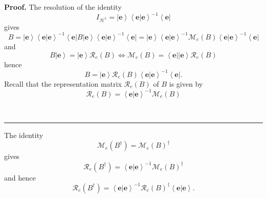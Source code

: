 \documentclass[aps,preprint]{revtex4}%
\newenvironment{proof}[1][Proof]{\noindent\textbf{#1.} }{\ \rule{0.5em}{0.5em}}
\begin{document}
\begin{proof}
The resolution of the identity%
\begin{equation}
I_{\mathcal{H}^{1}}=\left\vert \mathbf{e}\right\rangle \left\langle \left.
\mathbf{e}\right\vert \mathbf{e}\right\rangle ^{-1}\left\langle \mathbf{e}%
\right\vert
\end{equation}
gives
\begin{equation}
B=\left\vert \mathbf{e}\right\rangle \left\langle \left.  \mathbf{e}%
\right\vert \mathbf{e}\right\rangle ^{-1}\left\langle \mathbf{e}\right\vert
B\left\vert \mathbf{e}\right\rangle \left\langle \left.  \mathbf{e}\right\vert
\mathbf{e}\right\rangle ^{-1}\left\langle \mathbf{e}\right\vert =\left\vert
\mathbf{e}\right\rangle \left\langle \left.  \mathbf{e}\right\vert
\mathbf{e}\right\rangle ^{-1}\mathcal{M}_{e}\left(  B\right)  \left\langle
\left.  \mathbf{e}\right\vert \mathbf{e}\right\rangle ^{-1}\left\langle
\mathbf{e}\right\vert
\end{equation}
and
\begin{equation}
B\left\vert \mathbf{e}\right\rangle =\left\vert \mathbf{e}\right\rangle
\mathcal{R}_{e}\left(  B\right)  \Longleftrightarrow\mathcal{M}_{e}\left(
B\right)  =\left\langle \mathbf{e}\right\vert \left\vert \mathbf{e}%
\right\rangle \mathcal{R}_{e}\left(  B\right)
\end{equation}
hence
\begin{equation}
B=\left\vert \mathbf{e}\right\rangle \mathcal{R}_{e}\left(  B\right)
\left\langle \left.  \mathbf{e}\right\vert \mathbf{e}\right\rangle
^{-1}\left\langle \mathbf{e}\right\vert .
\end{equation}
Recall that the representation matrix $\mathcal{R}_{e}\left(  B\right)  $ of
$B$ is given by
\begin{equation}
\mathcal{R}_{e}\left(  B\right)  =\left\langle \left.  \mathbf{e}\right\vert
\mathbf{e}\right\rangle ^{-1}\mathcal{M}_{e}\left(  B\right)
\end{equation}

\end{proof}

The identity
\begin{equation}
\mathcal{M}_{e}\left(  B^{\dagger}\right)  =\mathcal{M}_{e}\left(  B\right)
^{\dagger}%
\end{equation}
gives
\begin{equation}
\mathcal{R}_{e}\left(  B^{\dagger}\right)  =\left\langle \left.
\mathbf{e}\right\vert \mathbf{e}\right\rangle ^{-1}\mathcal{M}_{e}\left(
B\right)  ^{\dagger}%
\end{equation}
and hence
\begin{equation}
\mathcal{R}_{e}\left(  B^{\dagger}\right)  =\left\langle \left.
\mathbf{e}\right\vert \mathbf{e}\right\rangle ^{-1}\mathcal{R}_{e}\left(
B\right)  ^{\dagger}\left\langle \left.  \mathbf{e}\right\vert \mathbf{e}%
\right\rangle .
\end{equation}
\end{document}

